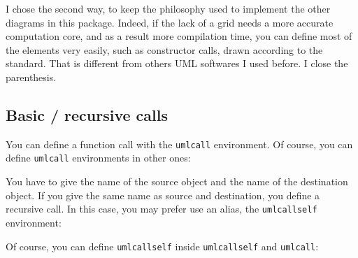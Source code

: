 \documentclass[a4paper,11pt]{report}
\begin{document}
I chose the second way, to keep the philosophy used to implement the other diagrams in this package. Indeed, if the lack of a grid needs a more accurate computation core, and as a result more compilation time, you can define most of the elements very easily, such as constructor calls, drawn according to the standard. That is different from others UML softwares I used before. I close the parenthesis.

\subsection{Basic / recursive calls}\label{ss.call}

You can define a function call with the {\tt umlcall} environment. Of course, you can define {\tt umlcall} environments in other ones:

\medskip

\begin{minipage}{0.4\textwidth}
	
\end{minipage}
\begin{minipage}{0.6\textwidth}
	\begin{center}
	\end{center}
\end{minipage}

\medskip

You have to give the name of the source object and the name of the destination object. If you give the same name as source and destination, you define a recursive call. In this case, you may prefer use an alias, the {\tt umlcallself} environment:

\medskip

\begin{minipage}{0.5\textwidth}
	
\end{minipage}
\begin{minipage}{0.5\textwidth}
	\begin{center}
	\end{center}
\end{minipage}

\medskip

Of course, you can define {\tt umlcallself} inside {\tt umlcallself} and {\tt umlcall}:

\medskip

\begin{minipage}{0.5\textwidth}
	
\end{minipage}
\begin{minipage}{0.5\textwidth}
	\begin{center}
	\end{center}
\end{minipage}
\end{document}

